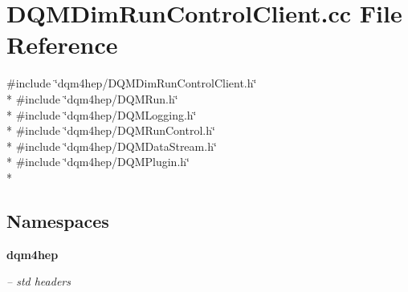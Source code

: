 \section{D\+Q\+M\+Dim\+Run\+Control\+Client.\+cc File Reference}
\label{DQMDimRunControlClient_8cc}
{\ttfamily \#include \char`\"{}dqm4hep/\+D\+Q\+M\+Dim\+Run\+Control\+Client.\+h\char`\"{}}\\*
{\ttfamily \#include \char`\"{}dqm4hep/\+D\+Q\+M\+Run.\+h\char`\"{}}\\*
{\ttfamily \#include \char`\"{}dqm4hep/\+D\+Q\+M\+Logging.\+h\char`\"{}}\\*
{\ttfamily \#include \char`\"{}dqm4hep/\+D\+Q\+M\+Run\+Control.\+h\char`\"{}}\\*
{\ttfamily \#include \char`\"{}dqm4hep/\+D\+Q\+M\+Data\+Stream.\+h\char`\"{}}\\*
{\ttfamily \#include \char`\"{}dqm4hep/\+D\+Q\+M\+Plugin.\+h\char`\"{}}\\*
\subsection*{Namespaces}
\begin{DoxyCompactItemize}
\item 
 {\bf dqm4hep}
\begin{DoxyCompactList}\small\item\em -- std headers \end{DoxyCompactList}\end{DoxyCompactItemize}
